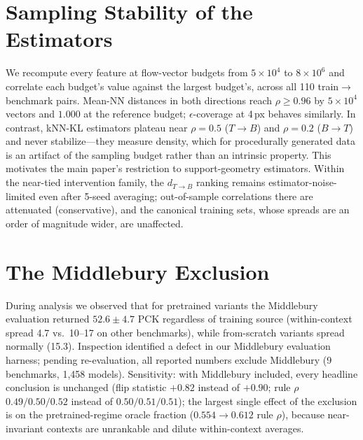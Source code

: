 \documentclass[runningheads]{llncs}
\newcommand{\dtb}{d_{T\to B}}
\newcommand{\pck}{PCK}
\begin{document}
\begin{table}[h]
\centering
\caption{Full recovered generator parameters from BFV-only search.}
\label{tab:recovery_full}
\small

\end{table}

\section{Sampling Stability of the Estimators}
\label{supp:sampling}

We recompute every feature at flow-vector budgets from $5{\times}10^4$ to
$8{\times}10^6$ and correlate each budget's value against the largest
budget's, across all 110 train$\to$benchmark pairs. Mean-NN distances in both
directions reach $\rho \ge 0.96$ by $5{\times}10^4$ vectors and $1.000$ at
the reference budget; $\epsilon$-coverage at 4\,px behaves similarly. In
contrast, kNN-KL estimators plateau near $\rho{=}0.5$ ($T{\to}B$) and
$\rho{=}0.2$ ($B{\to}T$) and never stabilize---they measure density, which
for procedurally generated data is an artifact of the sampling budget rather
than an intrinsic property. This motivates the main paper's restriction to
support-geometry estimators. Within the near-tied intervention family, the
$\dtb$ ranking remains estimator-noise-limited even after 5-seed averaging;
out-of-sample correlations there are attenuated (conservative), and the
canonical training sets, whose spreads are an order of magnitude wider, are
unaffected.

\section{The Middlebury Exclusion}
\label{supp:mid}

During analysis we observed that for pretrained variants the Middlebury
evaluation returned $52.6 \pm 4.7$ \pck{} regardless of training source
(within-context spread 4.7 vs.\ 10--17 on other benchmarks), while
from-scratch variants spread normally (15.3). Inspection identified a defect
in our Middlebury evaluation harness; pending re-evaluation, all reported
numbers exclude Middlebury (9 benchmarks, 1{,}458 models). Sensitivity: with
Middlebury included, every headline conclusion is unchanged (flip statistic
$+0.82$ instead of $+0.90$; rule $\rho$ $0.49/0.50/0.52$ instead of
$0.50/0.51/0.51$); the largest single effect of the exclusion is on the
pretrained-regime oracle fraction ($0.554\!\to\!0.612$ rule $\rho$), because
near-invariant contexts are unrankable and dilute within-context averages.
\end{document}
